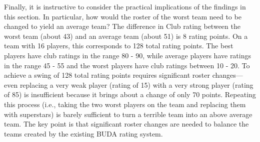 Finally, it is instructive to consider the practical implications of the findings in this section. In particular, how would the roster of the worst team need to be changed to yield an average team? The difference in Club rating between the worst team (about 43) and an average team (about 51) is 8 rating points. On a team with 16 players, this corresponds to 128 total rating points. The best players have club ratings in the range 80 - 90, while average players have ratings in the range 45 - 55 and the worst players have club ratings between 10 - 20. To achieve a swing of 128 total rating points requires significant roster changes---even replacing a very weak player (rating of 15) with a very strong player (rating of 85) is insufficient because it brings about a change of only 70 points. Repeating this process (i.e., taking the two worst players on the team and replacing them with superstars) is barely sufficient to turn a terrible team into an above average team. The key point is that significant roster changes are needed to balance the teams created by the existing BUDA rating system.